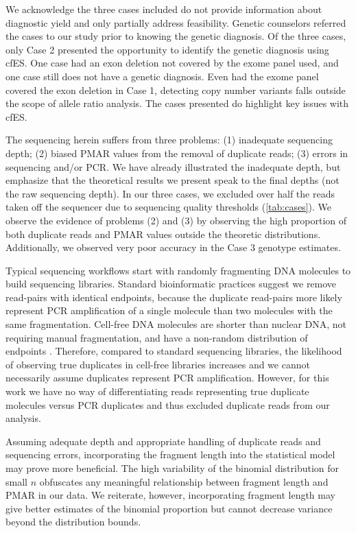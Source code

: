 \documentclass{article}\usepackage[]{graphicx}\usepackage[]{color}
\begin{document}
We acknowledge the three cases included do not provide information about diagnostic yield and only partially address feasibility.
Genetic counselors referred the cases to our study prior to knowing the genetic diagnosis.
Of the three cases, only Case 2 presented the opportunity to identify the genetic diagnosis using cfES.
One case had an exon deletion not covered by the exome panel used, and one case still does not have a genetic diagnosis.
Even had the exome panel covered the exon deletion in Case 1, detecting copy number variants falls outside the scope of allele ratio analysis.
The cases presented do highlight key issues with cfES.

The sequencing herein suffers from three problems: (1) inadequate sequencing depth; (2) biased PMAR values from the removal of duplicate reads; (3) errors in sequencing and/or PCR.
We have already illustrated the inadequate depth, but emphasize that the theoretical results we present speak to the final depths (not the raw sequencing depth).
In our three cases, we excluded over half the reads taken off the sequencer due to sequencing quality thresholds (\cref{tab:cases}).
We observe the evidence of problems (2) and (3) by observing the high proportion of both duplicate reads and PMAR values outside the theoretic distributions.
Additionally, we observed very poor accuracy in the Case 3 genotype estimates.

Typical sequencing workflows start with randomly fragmenting DNA molecules to build sequencing libraries.
Standard bioinformatic practices suggest we remove read-pairs with identical endpoints, because the duplicate read-pairs more likely represent PCR amplification of a single molecule than two molecules with the same fragmentation.
Cell-free DNA molecules are shorter than nuclear DNA, not requiring manual fragmentation, and have a non-random distribution of endpoints \cite{chan:2016aa}.
Therefore, compared to standard sequencing libraries, the likelihood of observing true duplicates in cell-free libraries increases and we cannot necessarily assume duplicates represent PCR amplification.
However, for this work we have no way of differentiating reads representing true duplicate molecules versus PCR duplicates and thus excluded duplicate reads from our analysis.

Assuming adequate depth and appropriate handling of duplicate reads and sequencing errors, incorporating the fragment length into the statistical model may prove more beneficial.
The high variability of the binomial distribution for small $n$ obfuscates any meaningful relationship between fragment length and PMAR in our data.
We reiterate, however, incorporating fragment length may give better estimates of the binomial proportion but cannot decrease variance beyond the distribution bounds.
\end{document}
